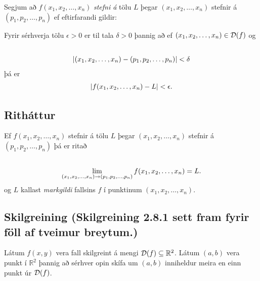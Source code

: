 \documentclass[a4paper,10pt,icelandic]{sphinxmanual}
\begin{document}
Segjum að \(f(x_1,x_2,\ldots,x_n)\) \textit{stefni á} tölu \(L\) þegar
\((x_1,x_2,\ldots,x_n)\) stefnir á \((p_1,p_2,\ldots,p_n)\) ef
eftirfarandi gildir:

Fyrir sérhverja tölu \(\epsilon>0\) er til tala \(\delta>0\)
þannig að ef \((x_1,x_2,\ldots,x_n)\in{\cal D}(f)\) og
\begin{gather}
\begin{split}\displaystyle\end{split}\notag\\\begin{split}|(x_1,x_2,\ldots,x_n)-(p_1,p_2,\ldots,p_n)|<\delta\end{split}\notag
\end{gather}
þá er
\begin{gather}
\begin{split}\displaystyle
|f(x_1,x_2,\ldots,x_n)-L|<\epsilon.\end{split}\notag
\end{gather}

\subsection{Ritháttur}
\label{Kafli2:rithattur}
Ef \(f(x_1,x_2,\ldots,x_n)\) stefnir á tölu \(L\) þegar
\((x_1,x_2,\ldots,x_n)\) stefnir á \((p_1,p_2,\ldots,p_n)\) þá
er ritað
\begin{gather}
\begin{split}\displaystyle\end{split}\notag\\\begin{split}\lim_{(x_1,x_2,\ldots,x_n)\rightarrow (p_1,p_2,\ldots,p_n)}
f(x_1,x_2,\ldots,x_n)=L.\end{split}\notag
\end{gather}
og \(L\) kallast \textit{markgildi} fallsins \(f\) í punktinum \((x_1,x_2,\ldots,x_n)\).


\subsection{Skilgreining (Skilgreining 2.8.1 sett fram fyrir föll af tveimur breytum.)}
\label{Kafli2:skilgreining-skilgreining-2-8-1-sett-fram-fyrir-foll-af-tveimur-breytum}
Látum \(f(x,y)\) vera fall skilgreint á mengi
\({\cal D}(f)\subseteq {\mathbb  R}^2\). Látum \((a,b)\) vera
punkt í \({\mathbb  R}^2\) þannig að sérhver opin skífa um
\((a,b)\) inniheldur meira en einn punkt úr \({\cal D}(f)\).
\end{document}

